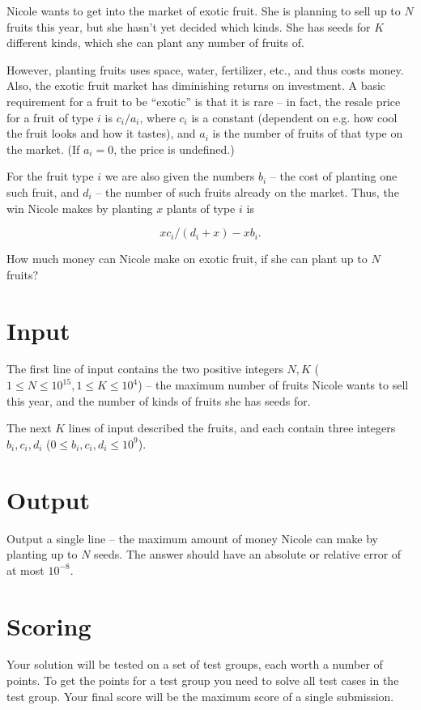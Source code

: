 Nicole wants to get into the market of exotic fruit.
She is planning to sell up to $N$ fruits this year, but she hasn't yet decided which kinds.
She has seeds for $K$ different kinds, which she can plant any number of fruits of.

However, planting fruits uses space, water, fertilizer, etc., and thus costs money.
Also, the exotic fruit market has diminishing returns on investment.
A basic requirement for a fruit to be ``exotic'' is that it is rare -- in fact, the
resale price for a fruit of type $i$ is $c_i / a_i$, where $c_i$ is a constant
(dependent on e.g. how cool the fruit looks and how it tastes), and $a_i$ is the number
of fruits of that type on the market. (If $a_i = 0$, the price is undefined.)

For the fruit type $i$ we are also given the numbers $b_i$ -- the cost of planting one
such fruit, and $d_i$ -- the number of such fruits already on the market.
Thus, the win Nicole makes by planting $x$ plants of type $i$ is

\[ x c_i / (d_i + x) - x b_i. \]

How much money can Nicole make on exotic fruit, if she can plant up to $N$ fruits?

\section*{Input}
The first line of input contains the two positive integers $N, K$ ($1 \le N \le 10^{15}, 1 \le K \le 10^4$) -- the maximum number of fruits
Nicole wants to sell this year, and the number of kinds of fruits she has seeds for.

The next $K$ lines of input described the fruits, and each contain three integers $b_i, c_i, d_i$ ($0 \le b_i, c_i, d_i \le 10^9$).

\section*{Output}
Output a single line -- the maximum amount of money Nicole can make by planting up to $N$ seeds.
The answer should have an absolute or relative error of at most $10^{-8}$.

\section*{Scoring}
Your solution will be tested on a set of test groups, each worth a number of points.
To get the points for a test group you need to solve all test cases in the test group.
Your final score will be the maximum score of a single submission.

